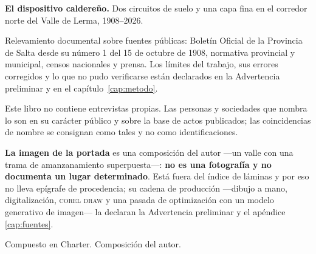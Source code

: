 \documentclass[10pt,a4paper,twoside,openright]{book}
\begin{document}
\thispagestyle{empty}
\null\vfill
{\footnotesize\color{gris}\setlength{\parskip}{0.6em}\parindent=0pt
\textbf{El dispositivo caldereño.} Dos circuitos de suelo y una capa fina en el
corredor norte del Valle de Lerma, 1908--2026.

Relevamiento documental sobre fuentes públicas: Boletín Oficial de la Provincia
de Salta desde su número 1 del 15 de octubre de 1908, normativa provincial y
municipal, censos nacionales y prensa. Los límites del trabajo, sus errores
corregidos y lo que no pudo verificarse están declarados en la Advertencia
preliminar y en el capítulo~\ref{cap:metodo}.

Este libro no contiene entrevistas propias. Las personas y sociedades que nombra
lo son en su carácter público y sobre la base de actos publicados; las
coincidencias de nombre se consignan como tales y no como identificaciones.

\textbf{La imagen de la portada} es una composición del autor ---un valle con una trama de
amanzanamiento superpuesta---: \textbf{no es una fotografía y no documenta un lugar
determinado}. Está fuera del índice de láminas y por eso no lleva epígrafe de procedencia;
su cadena de producción ---dibujo a mano, digitalización, \textsc{corel draw} y una pasada
de optimización con un modelo generativo de imagen--- la declaran la Advertencia preliminar
y el apéndice \ref{cap:fuentes}.

Compuesto en Charter. Composición del autor.\par}
\vspace{2em}
\cleardoublepage
\end{document}
